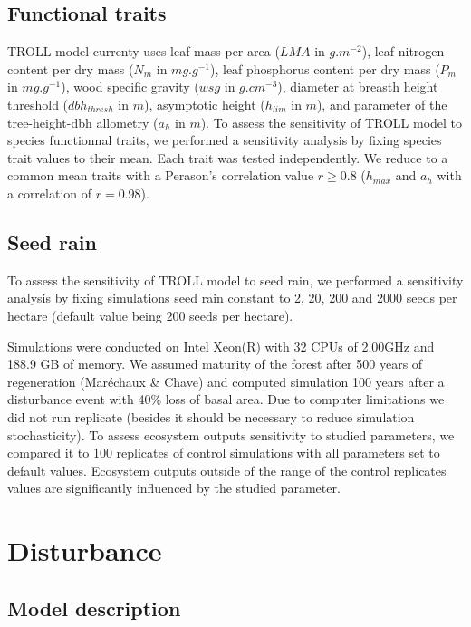 \documentclass[]{article}
\theoremstyle{definition}
\theoremstyle{definition}
\theoremstyle{remark}
\begin{document}
\subsection{Functional traits}\label{functional-traits}

TROLL model currenty uses leaf mass per area (\(LMA\) in \(g.m^{-2}\)),
leaf nitrogen content per dry mass (\(N_m\) in \(mg.g^{-1}\)), leaf
phosphorus content per dry mass (\(P_m\) in \(mg.g^{-1}\)), wood
specific gravity (\(wsg\) in \(g.cm^{-3}\)), diameter at breasth height
threshold (\(dbh_{thresh}\) in \(m\)), asymptotic height (\(h_{lim}\) in
\(m\)), and parameter of the tree-height-dbh allometry (\(a_h\) in
\(m\)). To assess the sensitivity of TROLL model to species functionnal
traits, we performed a sensitivity analysis by fixing species trait
values to their mean. Each trait was tested independently. We reduce to
a common mean traits with a Perason's correlation value \(r \geq 0.8\)
(\(h_{max}\) and \(a_h\) with a correlation of \(r=0.98\)).

\subsection{Seed rain}\label{seed-rain}

To assess the sensitivity of TROLL model to seed rain, we performed a
sensitivity analysis by fixing simulations seed rain constant to 2, 20,
200 and 2000 seeds per hectare (default value being 200 seeds per
hectare).

Simulations were conducted on Intel Xeon(R) with 32 CPUs of 2.00GHz and
188.9 GB of memory. We assumed maturity of the forest after 500 years of
regeneration (Maréchaux \& Chave) and computed simulation 100 years
after a disturbance event with 40\% loss of basal area. Due to computer
limitations we did not run replicate (besides it should be necessary to
reduce simulation stochasticity). To assess ecosystem outputs
sensitivity to studied parameters, we compared it to 100 replicates of
control simulations with all parameters set to default values. Ecosystem
outputs outside of the range of the control replicates values are
significantly influenced by the studied parameter.

\section{Disturbance}\label{disturbance}

\subsection{Model description}\label{model-description-1}
\end{document}
